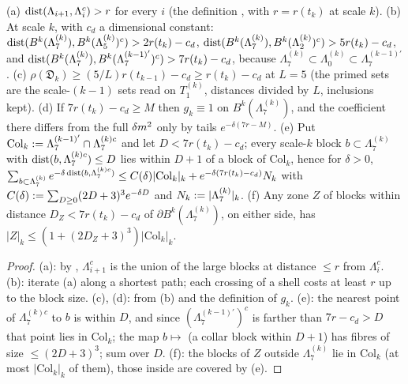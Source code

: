 \begin{lemma}[geometry]\label{lem:a06d:V8}
\textup{(a)} $\operatorname{dist}(\Lambda_{i+1},\Lambda_i^c)>r$ for every $i$ (the definition \cite[(2.8)]{Ba2}, with $r=r(t_k)$ at scale $k$). \textup{(b)} At scale $k$, with $c_d$ a dimensional constant: $\operatorname{dist}(B^k(\Lambda^{(k)}_7),B^k(\Lambda^{(k)}_5)^c)>2r(t_k)-c_d$, $\operatorname{dist}(B^k(\Lambda^{(k)}_7),B^k(\Lambda^{(k)}_2)^c)>5r(t_k)-c_d$, and $\operatorname{dist}(B^k(\Lambda^{(k)}_7),B^k(\Lambda^{(k-1)'}_7)^c)>7r(t_k)-c_d$, because $\Lambda^{(k)}_7\subset\Lambda^{(k)}_0\subset\Lambda^{(k-1)'}_7$ \cite[p.~570]{Ba2}. \textup{(c)} $\rho(\mathfrak D_k)\ge(5/L)r(t_{k-1})-c_d\ge r(t_k)-c_d$ at $L=5$ (the primed sets are the scale-$(k-1)$ sets read on $T^{(k)}_1$, distances divided by $L$, inclusions kept). \textup{(d)} If $7r(t_k)-c_d\ge M$ then $g_k\equiv1$ on $B^k(\Lambda^{(k)}_7)$, and the coefficient \cite[(1.29)]{Ba3} there differs from the full $\delta m^2$ only by tails $e^{-\delta(7r-M)}$. \textup{(e)} Put $\mathrm{Col}_k:=\Lambda^{(k-1)'}_7\cap\Lambda^{(k)c}_7$ and let $D<7r(t_k)-c_d$; every scale-$k$ block $b\subset\Lambda^{(k)}_7$ with $\operatorname{dist}(b,\Lambda^{(k)c}_7)\le D$ lies within $D+1$ of a block of $\mathrm{Col}_k$, hence for $\delta>0$, $\sum_{b\subset\Lambda^{(k)}_7}e^{-\delta\operatorname{dist}(b,\Lambda^{(k)c}_7)}\le C(\delta)|\mathrm{Col}_k|_k+e^{-\delta(7r(t_k)-c_d)}N_k$ with $C(\delta):=\sum_{D\ge0}(2D+3)^3e^{-\delta D}$ and $N_k:=|\Lambda^{(k)}_7|_k$. \textup{(f)} Any zone $Z$ of blocks within distance $D_Z<7r(t_k)-c_d$ of $\partial B^k(\Lambda^{(k)}_7)$, on either side, has $|Z|_k\le(1+(2D_Z+3)^3)|\mathrm{Col}_k|_k$.
\end{lemma}

\begin{proof}
(a): by \cite[(2.8)]{Ba2}, $\Lambda^c_{i+1}$ is the union of the large blocks at distance $\le r$ from $\Lambda^c_i$. (b): iterate (a) along a shortest path; each crossing of a shell costs at least $r$ up to the block size. (c), (d): from (b) and the definition of $g_k$. (e): the nearest point of $\Lambda^{(k)c}_7$ to $b$ is within $D$, and since $(\Lambda^{(k-1)'}_7)^c$ is farther than $7r-c_d>D$ that point lies in $\mathrm{Col}_k$; the map $b\mapsto$ (a collar block within $D+1$) has fibres of size $\le(2D+3)^3$; sum over $D$. (f): the blocks of $Z$ outside $\Lambda^{(k)}_7$ lie in $\mathrm{Col}_k$ (at most $|\mathrm{Col}_k|_k$ of them), those inside are covered by (e).
\end{proof}
